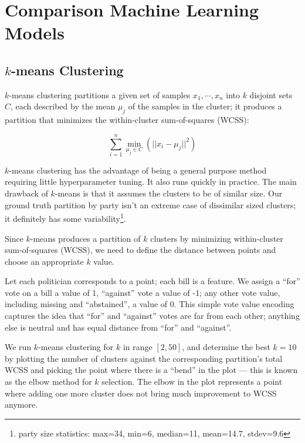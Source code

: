 
\chapter{Comparison Machine Learning Models}
\label{ch:comparison}
\vspace{2em}

\section{$k$-means Clustering}
\label{sec:k_means_clustering}

$k$-means clustering partitions a given set of samples $x_1, \cdots, x_n$ into
$k$ disjoint sets $C$, each described by the mean $\mu_j$ of the samples in the
cluster;
it produces a partition that minimizes the within-cluster sum-of-squares (WCSS):

\[
    \sum_{i=1}^{n} \underset{\mu_j \in C}{\min}(||x_i - \mu_j||^2)
\]

$k$-means clustering has the advantage of being a general purpose method
requiring little hyperparameter tuning. It also runs quickly in practice.
The main drawback of $k$-means is that it assumes the clusters to be of similar size.
Our ground truth partition by party isn't an extreme case of dissimilar sized
clusters; it definitely has some variability\footnote{party size statistics:
max=34, min=6, median=11, mean=14.7, stdev=9.6}.

Since $k$-means produces a partition of $k$ clusters by minimizing within-cluster
sum-of-squares (WCSS), we need to define the distance between points and choose
an appropriate $k$ value.

Let each politician corresponds to a point; each bill is a feature.
We assign a ``for'' vote on a bill a value of 1, ``against'' vote a value of -1;
any other vote value, including missing and ``abstained'', a value of 0.
This simple vote value encoding captures the idea that ``for'' and ``against''
votes are far from each other; anything else is neutral and has equal distance
from ``for'' and ``against''.

We run $k$-means clustering for $k$ in range $[2, 50]$, and determine the best
$k=10$ by plotting the number of clusters against the corresponding partition's
total WCSS and picking the point where there is a ``bend'' in the plot
--- this is known as the elbow method for $k$ selection.
The elbow in the plot represents a point where adding one more cluster does not
bring much improvement to WCSS anymore.

